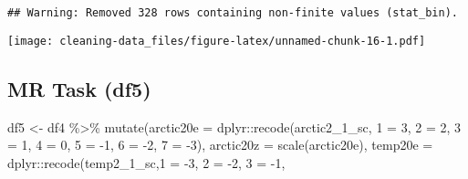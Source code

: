 \documentclass[
]{article}
\newenvironment{Shaded}{\begin{snugshade}}{\end{snugshade}}
\newcommand{\AttributeTok}[1]{\textcolor[rgb]{0.77,0.63,0.00}{#1}}
\newcommand{\DecValTok}[1]{\textcolor[rgb]{0.00,0.00,0.81}{#1}}
\newcommand{\FunctionTok}[1]{\textcolor[rgb]{0.00,0.00,0.00}{#1}}
\newcommand{\NormalTok}[1]{#1}
\newcommand{\OtherTok}[1]{\textcolor[rgb]{0.56,0.35,0.01}{#1}}
\newcommand{\SpecialCharTok}[1]{\textcolor[rgb]{0.00,0.00,0.00}{#1}}
\newcommand{\StringTok}[1]{\textcolor[rgb]{0.31,0.60,0.02}{#1}}
\begin{document}
\begin{verbatim}
## Warning: Removed 328 rows containing non-finite values (stat_bin).
\end{verbatim}

\texttt{[image: cleaning-data\_files/figure-latex/unnamed-chunk-16-1.pdf]}

\hypertarget{mr-task-df5}{%
\subsection{MR Task (df5)}\label{mr-task-df5}}

\begin{Shaded}
\begin{Highlighting}[]
\NormalTok{df5 }\OtherTok{\textless{}{-}}\NormalTok{ df4 }\SpecialCharTok{\%\textgreater{}\%} 
  \FunctionTok{mutate}\NormalTok{(}\AttributeTok{arctic20e =}\NormalTok{ dplyr}\SpecialCharTok{::}\FunctionTok{recode}\NormalTok{(arctic2\_1\_sc, }\StringTok{\textasciigrave{}}\AttributeTok{1}\StringTok{\textasciigrave{}} \OtherTok{=} \DecValTok{3}\NormalTok{,}
                           \StringTok{\textasciigrave{}}\AttributeTok{2}\StringTok{\textasciigrave{}} \OtherTok{=} \DecValTok{2}\NormalTok{,}
                           \StringTok{\textasciigrave{}}\AttributeTok{3}\StringTok{\textasciigrave{}} \OtherTok{=} \DecValTok{1}\NormalTok{,}
                           \StringTok{\textasciigrave{}}\AttributeTok{4}\StringTok{\textasciigrave{}} \OtherTok{=} \DecValTok{0}\NormalTok{,}
                           \StringTok{\textasciigrave{}}\AttributeTok{5}\StringTok{\textasciigrave{}} \OtherTok{=} \SpecialCharTok{{-}}\DecValTok{1}\NormalTok{,}
                           \StringTok{\textasciigrave{}}\AttributeTok{6}\StringTok{\textasciigrave{}} \OtherTok{=} \SpecialCharTok{{-}}\DecValTok{2}\NormalTok{,}
                           \StringTok{\textasciigrave{}}\AttributeTok{7}\StringTok{\textasciigrave{}} \OtherTok{=} \SpecialCharTok{{-}}\DecValTok{3}\NormalTok{),}
         \AttributeTok{arctic20z =} \FunctionTok{scale}\NormalTok{(arctic20e),}
         \AttributeTok{temp20e =}\NormalTok{ dplyr}\SpecialCharTok{::}\FunctionTok{recode}\NormalTok{(temp2\_1\_sc,}\StringTok{\textasciigrave{}}\AttributeTok{1}\StringTok{\textasciigrave{}} \OtherTok{=} \SpecialCharTok{{-}}\DecValTok{3}\NormalTok{,}
                           \StringTok{\textasciigrave{}}\AttributeTok{2}\StringTok{\textasciigrave{}} \OtherTok{=} \SpecialCharTok{{-}}\DecValTok{2}\NormalTok{,}
                           \StringTok{\textasciigrave{}}\AttributeTok{3}\StringTok{\textasciigrave{}} \OtherTok{=} \SpecialCharTok{{-}}\DecValTok{1}\NormalTok{,}

\end{Highlighting}
\end{Shaded}
\end{document}
